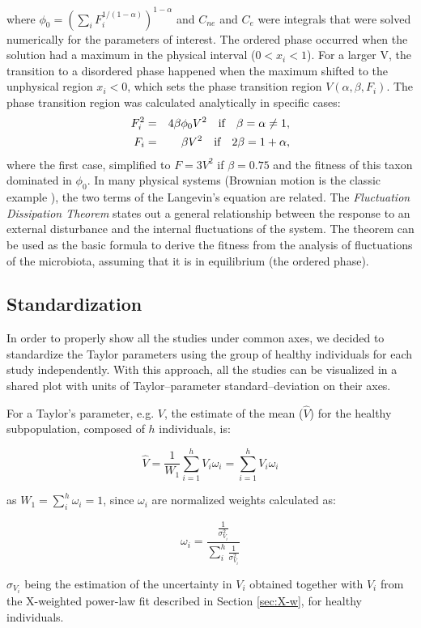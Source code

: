 where $\phi_0 = (\sum_i F_i^{1/(1-\alpha)})^{1-\alpha}$ and $C_{ne}$ and $C_{e}$ were integrals that were solved numerically for the parameters of interest. The ordered phase occurred when the solution had a maximum in the physical interval ($0<x_i<1$). For a larger V, the transition to a disordered phase happened when the maximum shifted to the unphysical region $x_i<0$, which sets the phase transition region $V(\alpha,\beta,F_i)$. The phase transition region was calculated analytically in specific cases:
\begin{eqnarray*}
F_i^2 &=& 4 \beta \phi_0 V^2\quad \textrm{if} \quad  \beta = \alpha \neq 1,\\
F_i &=& \beta V^2\quad \textrm{if} \quad  2\beta = 1+\alpha,
\notag
\end{eqnarray*}
where the first case, simplified to $F = 3 V^2$ if $\beta = 0.75$ and the fitness of this taxon dominated in $\phi_0$. 
In many physical systems (Brownian motion is the classic example \cite{Einstein}), the two terms of the Langevin's equation are related.  The \emph{Fluctuation Dissipation Theorem} states out a general relationship between the response to an external disturbance and the internal fluctuations of the system\cite{FD}. The theorem can be used as the basic formula to derive the fitness from the analysis of fluctuations 
of the microbiota, assuming that it is in equilibrium (the ordered phase).  

\subsection*{Standardization} \label{sec:stan}
In order to properly show all the studies under common axes, we decided to standardize the Taylor parameters using the group of healthy individuals for each study independently. With this approach, all the studies can be visualized in a shared plot with units of Taylor--parameter standard--deviation on their axes.

For a Taylor's parameter, e.g. $V$, the estimate of the mean ($\widehat{V}$) for the healthy subpopulation, composed of $h$ individuals, is:
\begin{linenomath}
$$\widehat{V} = \frac{1}{W_1}\sum_{i=1}^h V_i \omega_i=\sum_{i=1}^h V_i \omega_i$$
\end{linenomath}
as $W_1=\sum_i^h \omega_i=1$, since $\omega_i$ are normalized weights calculated as:
\begin{linenomath}
$$\omega_i = \frac{\frac{1}{\sigma^2_{V_i}}}{\sum_i^h\frac{1}{\sigma^2_{V_i}}}$$
\end{linenomath}
$\sigma_{V_i}$ being the estimation of the uncertainty in $V_i$ obtained together with $V_i$ from the X-weighted power-law fit described in Section \ref{sec:X-w}, for healthy individuals.

